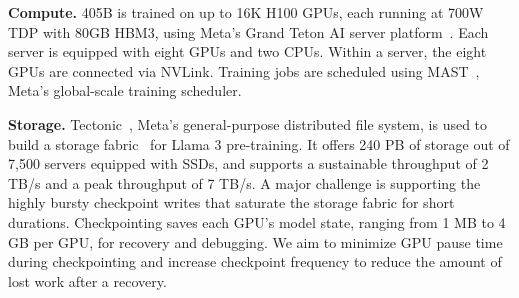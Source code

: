 \documentclass[dvipsnames]{fairmeta}
\begin{document}
\textbf{Compute.}
\llamathree 405B is trained on up to 16K H100 GPUs, each running at 700W TDP with 80GB HBM3, using Meta's Grand Teton AI server platform~\citep{various2022grandteton}. Each server is equipped with eight GPUs and two CPUs. Within a server, the eight GPUs are connected via NVLink. Training jobs are scheduled using MAST~\citep{choudhury2024mast}, Meta's global-scale training scheduler.

\textbf{Storage.} 
Tectonic~\citep{pan2021tectonicfs}, Meta's general-purpose distributed file system, is used to build a storage fabric~\citep{battey2024storage} for Llama 3 pre-training. It offers 240 PB of storage out of 7,500 servers equipped with SSDs, and supports a sustainable throughput of 2 TB/s and a peak throughput of 7 TB/s. A major challenge is supporting the highly bursty checkpoint writes that saturate the storage fabric for short durations. Checkpointing saves each GPU’s model state, ranging from 1 MB to 4 GB per GPU, for recovery and debugging. We aim to minimize GPU pause time during checkpointing and increase checkpoint frequency to reduce the amount of lost work after a recovery. 
\end{document}
